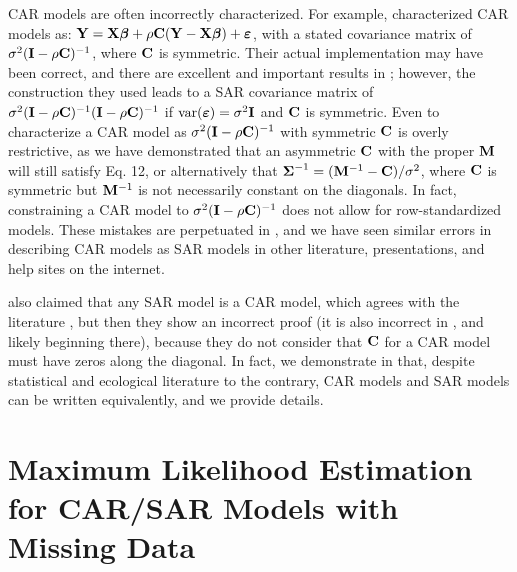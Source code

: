 \documentclass[11pt, titlepage]{article}\usepackage[]{graphicx}\usepackage[]{color}
\begin{document}
CAR models are often incorrectly characterized.  For example, \citet{Keit:Bjor:Dixo:Citr:acco:2002} characterized CAR models as: $\mathbf{Y} = \mathbf{X}{\boldsymbol{\beta}} + \rho\mathbf{C}(\mathbf{Y} - \mathbf{X}{\boldsymbol{\beta}}) + \mbox{\boldmath $\varepsilon$}$, with a stated covariance matrix of $\sigma^2(\mathbf{I} - \rho\mathbf{C})^{-1}$, where $\mathbf{C}$ is symmetric. Their actual implementation may have been correct, and there are excellent and important results in \citet{Keit:Bjor:Dixo:Citr:acco:2002}; however, the construction they used leads to a SAR covariance matrix of $\sigma^2(\mathbf{I} - \rho\mathbf{C})^{-1}(\mathbf{I} - \rho\mathbf{C})^{-1}$ if $\textrm{var}(\mbox{\boldmath $\varepsilon$}) = \sigma^2\mathbf{I}$ and $\mathbf{C}$ is symmetric. Even to characterize a CAR model as $\sigma^2(\mathbf{I} - \rho\mathbf{C})^{-1}$ with symmetric $\mathbf{C}$ is overly restrictive, as we have demonstrated that an asymmetric $\mathbf{C}$ with the proper $\mathbf{M}$ will still satisfy Eq. 12, or alternatively that $\mbox{\boldmath $\Sigma$}^{-1} = (\mathbf{M}^{-1} - \mathbf{C})/\sigma^2$, where $\mathbf{C}$ is symmetric but $\mathbf{M}^{-1}$ is not necessarily constant on the diagonals. In fact, constraining a CAR model to $\sigma^2(\mathbf{I} - \rho\mathbf{C})^{-1}$ does not allow for row-standardized models.  These mistakes are perpetuated in \citet{Dorm:etal:meth:2007}, and we have seen similar errors in describing CAR models as SAR models in other literature, presentations, and help sites on the internet. 

\citet{Dorm:etal:meth:2007} also claimed that any SAR model is a CAR model, which agrees with the literature \citep[e.g.,][p. 409]{Cres:stat:1993}, but then they show an incorrect proof (it is also incorrect in \citet[][p. 89]{Hain:spat:1990}, and likely beginning there), because they do not consider that $\mathbf{C}$ for a CAR model must have zeros along the diagonal.  In fact, we demonstrate in \citet{Ver:Hank:Hoot:2017} that, despite statistical and ecological literature to the contrary, CAR models and SAR models can be written equivalently, and we provide details.

\section*{Maximum Likelihood Estimation for CAR/SAR Models with Missing Data}
\end{document}
